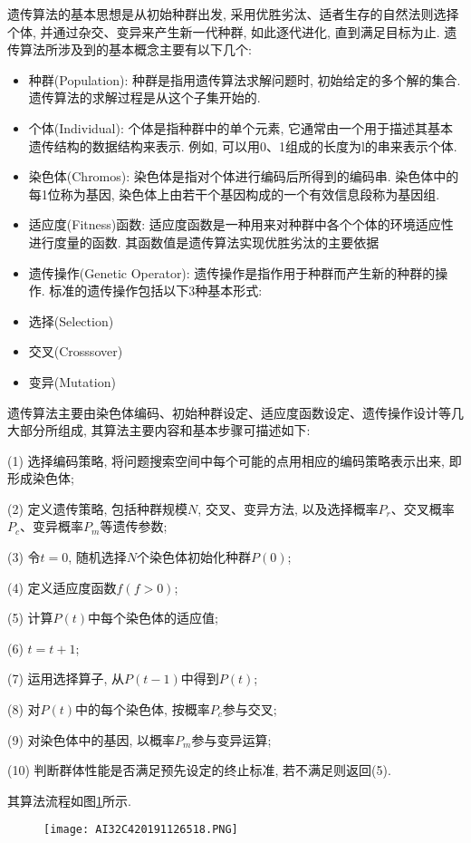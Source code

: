 遗传算法的基本思想是从初始种群出发, 采用优胜劣汰、适者生存的自然法则选择个体, 并通过杂交、变异来产生新一代种群, 如此逐代进化, 直到满足目标为止. 遗传算法所涉及到的基本概念主要有以下几个:
\begin{itemize}
\item 种群(Population): 种群是指用遗传算法求解问题时, 初始给定的多个解的集合. 遗传算法的求解过程是从这个子集开始的.
\item 个体(Individual): 个体是指种群中的单个元素, 它通常由一个用于描述其基本遗传结构的数据结构来表示. 例如, 可以用0、1组成的长度为l的串来表示个体.
\item 染色体(Chromos): 染色体是指对个体进行编码后所得到的编码串. 染色体中的每1位称为基因, 染色体上由若干个基因构成的一个有效信息段称为基因组.
\item 适应度(Fitness)函数: 适应度函数是一种用来对种群中各个个体的环境适应性进行度量的函数. 其函数值是遗传算法实现优胜劣汰的主要依据
\item 遗传操作(Genetic Operator): 遗传操作是指作用于种群而产生新的种群的操作. 标准的遗传操作包括以下3种基本形式:
\item 选择(Selection)
\item 交叉(Crosssover)
\item 变异(Mutation)
\end{itemize}

遗传算法主要由染色体编码、初始种群设定、适应度函数设定、遗传操作设计等几大部分所组成, 其算法主要内容和基本步骤可描述如下:

(1) 选择编码策略, 将问题搜索空间中每个可能的点用相应的编码策略表示出来, 即形成染色体;

(2) 定义遗传策略, 包括种群规模$N$, 交叉、变异方法, 以及选择概率$P_r$、交叉概率$P_c$、变异概率$P_m$等遗传参数;

(3) 令$t=0$, 随机选择$N$个染色体初始化种群$P(0)$;

(4) 定义适应度函数$f(f>0)$;

(5) 计算$P(t)$中每个染色体的适应值;

(6) $t=t+1$;

(7) 运用选择算子, 从$P(t-1)$中得到$P(t)$;

(8) 对$P(t)$中的每个染色体, 按概率$P_c$参与交叉;

(9) 对染色体中的基因, 以概率$P_m$参与变异运算;

(10) 判断群体性能是否满足预先设定的终止标准, 若不满足则返回(5).

其算法流程如图\ref{AI32fig2019120226518}所示.
\begin{figure}[H]
\centering
\texttt{[image: AI32C420191126518.PNG]}
\caption{}
\label{AI32fig2019120226518}
\end{figure}
